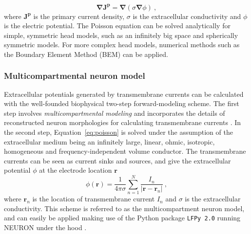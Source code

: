 \documentclass[preprint,10pt,authoryear]{elsarticle}
\begin{document}
\begin{equation} \label{eq:poisson}
\mathbf{\nabla} \mathbf{J^p} = \mathbf{\nabla} (\sigma \mathbf{\nabla} \phi)~,
\end{equation}
where $\mathbf{J^p}$ is the primary current density, $\sigma$ is the extracellular conductivity and $\phi$ is the electric potential. The Poisson equation can be solved analytically for simple, symmetric head models, such as an infinitely big space and spherically symmetric models. For more complex head models, numerical methods such as the Boundary Element Method (BEM) can be applied.

\subsubsection{Multicompartmental neuron model}
Extracellular potentials generated by transmembrane currents can be calculated with the well-founded biophysical two-step forward-modeling scheme. The first step involves \textit{multicompartmental modeling} and incorporates the details of reconstructed neuron morphologies for calculating transmembrane currents \citep{STERRATT2011}. In the second step, Equation~\eqref{eq:poisson} is solved under the assumption of the extracellular medium being an infinitely large, linear, ohmic, isotropic, homogeneous and frequency-independent volume conductor. The transmembrane currents can be seen as current sinks and sources, and give the extracellular potential $\phi$ at the electrode location $\mathbf{r}$
\begin{equation}
\phi(\mathbf{r}) = \frac{1}{4 \pi \sigma}\sum_{n=1}^N \frac{I_n}{|\mathbf{r} - \mathbf{r}_n|}~,
\label{eq:point_source}
\end{equation}
where $\mathbf{r}_n$ is the location of transmembrane current $I_n$ and $\sigma$ is the extracellular conductivity.
This scheme is referred to as the multicompartment neuron model, and can easily be applied making use of the Python package \texttt{LFPy 2.0} running NEURON under the hood \citep{HAGEN2018,CARNEVALE2006}.
\end{document}
